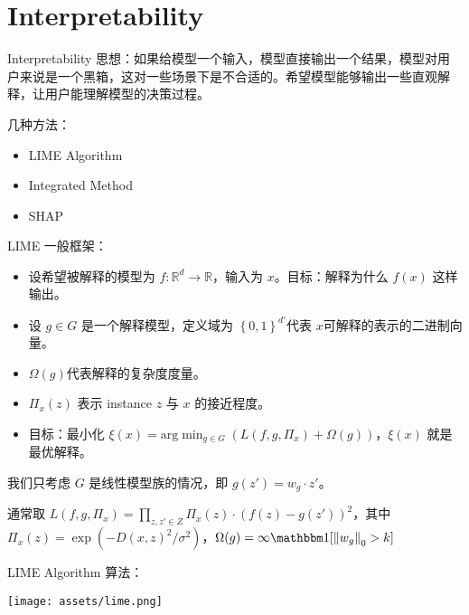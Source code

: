 \section{Interpretability}

\begin{frame}{Interpretability}
    思想：如果给模型一个输入，模型直接输出一个结果，模型对用户来说是一个黑箱，这对一些场景下是不合适的。希望模型能够输出一些直观解释，让用户能理解模型的决策过程。

    几种方法：
    \begin{itemize}
        \item LIME Algorithm
        \item Integrated Method
        \item SHAP
    \end{itemize}
\end{frame}

\begin{frame}{LIME}
    一般框架：
    \begin{itemize}
        \item 设希望被解释的模型为 $f: \mathbb{R}^{d}\to \mathbb{R}$，输入为 $x$。目标：解释为什么 $f(x)$ 这样输出。
        \item 设 $g \in G$ 是一个解释模型，定义域为 $\left\{ 0, 1 \right\}^{d'} $代表 $x$可解释的表示的二进制向量。
        \item $\Omega(g)$代表解释的复杂度度量。
        \item $\Pi_x(z)$ 表示 instance $z$ 与 $x$ 的接近程度。
        \item 目标：最小化 $\xi(x) = \text{arg}\min_{g \in G}\left( L(f, g, \Pi_x) + \Omega(g) \right) $，$\xi(x)$ 就是最优解释。
    \end{itemize}
    我们只考虑 $G$ 是线性模型族的情况，即 $g(z') = w_g \cdot z'$。
    
    通常取 $L(f, g, \Pi_x) = \prod_{z, z' \in Z} \Pi_x (z) \cdot (f(z) - g(z'))^{2}$，其中$\Pi_x(z) = \exp\left( - D(x, z)^{2} / \sigma^{2} \right) $，$\Omega(g) = \infty \mathbbm 1[\left\| w_g \right\| _0 > k]$

\end{frame}

\begin{frame}{LIME Algorithm}
    算法：
    \begin{center}
        \texttt{[image: assets/lime.png]}
    \end{center}
\end{frame}

